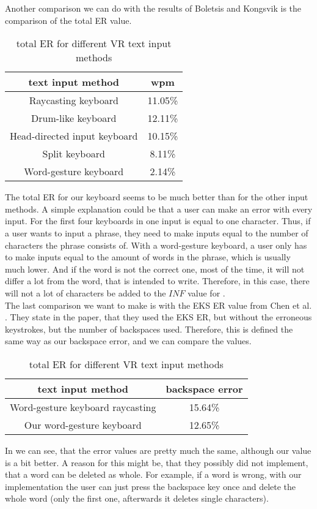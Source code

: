 Another comparison we can do with the results of Boletsis and Kongsvik \cite{Boletsis2019ControllerbasedTT} is the comparison of the total ER value.
\begin{table}[H]
    \centering
    \caption{total ER for different VR text input methods}
    \begin{tabular}{cc} \toprule
        text input method&wpm\\ \midrule
        Raycasting keyboard& 11.05\%\\
        Drum-like keyboard& 12.11\%\\
        Head-directed input keyboard& 10.15\%\\
        Split keyboard& 8.11\%\\
        Word-gesture keyboard& 2.14\%\\
        \bottomrule
    \end{tabular}
    \label{tab:total_er_compare}
\end{table}
The total ER for our keyboard seems to be much better than for the other input methods. A simple explanation could be that a user can make an error with every input. For the first four keyboards in  one input is equal to one character. Thus, if a user wants to input a phrase, they need to make inputs equal to the number of characters the phrase consists of. With a word-gesture keyboard, a user only has to make inputs equal to the amount of words in the phrase, which is usually much lower. And if the word is not the correct one, most of the time, it will not differ a lot from the word, that is intended to write. Therefore, in this case, there will not a lot of characters be added to the $INF$ value for .\\

The last comparison we want to make is with the EKS ER value from Chen et al. \cite{10.1145/3290607.3312762}. They state in the paper, that they used the EKS ER, but without the erroneous keystrokes, but the number of backspaces used. Therefore, this is defined the same way as our backspace error, and we can compare the values.
\begin{table}[H]
    \centering
    \caption{total ER for different VR text input methods}
    \begin{tabular}{cc} \toprule
        text input method&backspace error\\ \midrule
        Word-gesture keyboard raycasting&15.64\%\\
        Our word-gesture keyboard&12.65\%\\
        \bottomrule
    \end{tabular}
    \label{tab:error_backspace_compare}
\end{table}
In  we can see, that the error values are pretty much the same, although our value is a bit better. A reason for this might be, that they possibly did not implement, that a word can be deleted as whole. For example, if a word is wrong, with our implementation the user can just press the backspace key once and delete the whole word (only the first one, afterwards it deletes single characters).\\

